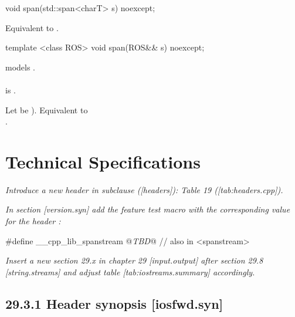 \documentclass[ebook,11pt,article]{memoir}
\begin{document}
\begin{itemdecl}
void span(std::span<charT> s) noexcept;
\end{itemdecl}

\begin{itemdescr}
\pnum
\effects
Equivalent to
.
\end{itemdescr}

\begin{addedblock}
\begin{itemdecl}
template <class ROS>
void span(ROS&& s) noexcept;
\end{itemdecl}

\begin{itemdescr}
\pnum
\constraints
{} models .\\
\\  is .
 
\pnum
\effects
Let  be ). 
Equivalent to \\
.
\end{itemdescr}

\end{addedblock}

\chapter{Technical Specifications}

\emph{Introduce a new header  in subclause ([headers]): Table 19 ([tab:headers.cpp]).}

\emph{In section [version.syn] add the feature test macro  
with the corresponding value for the header :}
\begin{codeblock}
#define __cpp_lib_spanstream  @\emph{TBD}@ // also in <spanstream>
\end{codeblock}

\emph{Insert a new section 29.x in chapter 29 [input.output] after section 29.8 [string.streams] and adjust table [tab:iostreams.summary] accordingly.}


\section{29.3.1 Header  synopsis [iosfwd.syn]}
\end{document}
